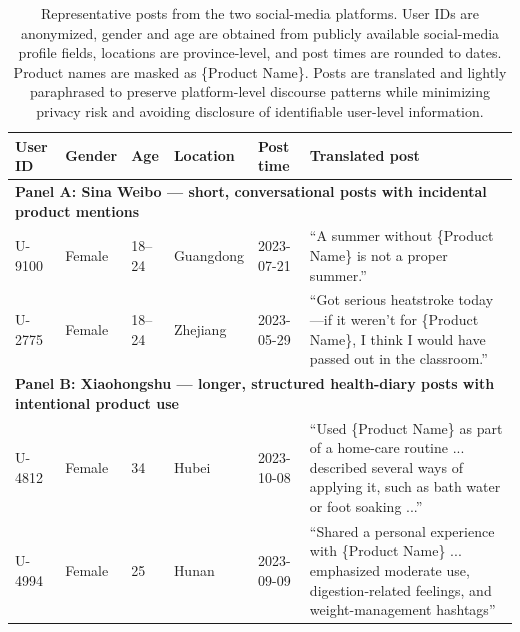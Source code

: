 \documentclass{article}
\begin{document}
\begin{table}[htb!]
\centering
\small
\begin{tabular}{p{}p{}p{}p{}p{}p{}}
\toprule
User ID & Gender & Age & Location & Post time & Translated post \\
\midrule
\multicolumn{6}{l}{\textbf{Panel A: Sina Weibo --- short, conversational posts with incidental product mentions}} \\
\midrule

U-9100 & Female & 18--24 & Guangdong & 2023-07-21 &
``A summer without \{Product Name\} is not a proper summer.'' \\[3pt]

U-2775 & Female & 18--24 & Zhejiang & 2023-05-29 &
``Got serious heatstroke today---if it weren't for \{Product Name\},
I think I would have passed out in the classroom.'' \\[3pt]

\midrule
\multicolumn{6}{l}{\textbf{Panel B: Xiaohongshu --- longer, structured health-diary posts with intentional product use}} \\
\midrule

U-4812 & Female & 34 & Hubei & 2023-10-08 &
``Used \{Product Name\} as part of a home-care routine ... described
several ways of applying it, such as bath water or foot soaking ...'' \\[3pt]

U-4994 & Female & 25 & Hunan & 2023-09-09 &
``Shared a personal experience with \{Product Name\} ... emphasized
moderate use, digestion-related feelings, and weight-management hashtags'' \\[3pt]

\bottomrule
\end{tabular}
\caption{Representative posts from the two social-media platforms. User IDs are anonymized, gender and age are obtained from publicly available social-media profile fields, locations are province-level, and post times are rounded to dates. Product names are masked as \{Product Name\}. Posts are translated and lightly paraphrased to preserve platform-level discourse patterns while minimizing privacy risk and avoiding disclosure of identifiable user-level information.}
\label{tab:sm_examples}
\end{table}
\end{document}
